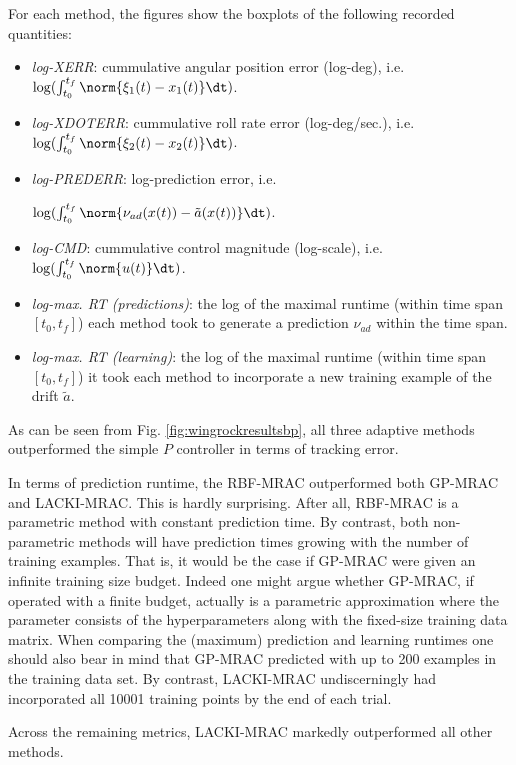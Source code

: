 	
	For each method, the figures show the boxplots of the following recorded quantities: 
	\begin{itemize}
		\item \textit{log-XERR}: cummulative angular position error (log-deg), i.e. $\log(\int_{t_0}^{t_f} \norm{\xi_1(t) - x_1 (t)} \dt )$.
		\item \textit{log-XDOTERR}:  cummulative roll rate error (log-deg/sec.), i.e. $\log(\int_{t_0}^{t_f} \norm{\xi_2(t) - x_2 (t)} \dt )$.
		\item \textit{log-PREDERR}: log-prediction error, i.e. 
		
		$\log(\int_{t_0}^{t_f} \norm{\nu_{ad}(x(t)) - \tilde a(x(t))} \dt )$.
		\item \textit{log-CMD}: cummulative control magnitude (log-scale), i.e. $\log(\int_{t_0}^{t_f} \norm{u(t)} \dt )$.
		\item \textit{log-max. RT (predictions)}: the log of the maximal runtime (within time span $[t_0,t_f]$) each method took to generate a prediction $\nu_{ad}$ within the time span.
		\item \textit{log-max. RT (learning)}: the log of the maximal runtime (within time span $[t_0,t_f]$) it took each method to incorporate a new training example of the drift $\tilde a$.
	\end{itemize}
	
	As can be seen from Fig. \ref{fig:wingrockresultsbp}, all three adaptive methods outperformed the simple $P$ controller in terms of tracking error. 
	
	In terms of prediction runtime, the RBF-MRAC outperformed both GP-MRAC and LACKI-MRAC. This is hardly surprising. After all, RBF-MRAC is a parametric method with constant prediction time. By contrast, both non-parametric methods will have prediction times growing with the number of training examples.
That is, it would be the case if GP-MRAC were given an infinite training size budget. Indeed one might argue whether GP-MRAC, if operated with a finite budget, actually is a parametric approximation where the parameter consists of the hyperparameters along with the fixed-size training data matrix. When comparing the (maximum) prediction and learning runtimes one should also bear in mind that GP-MRAC predicted with up to 200 examples in the training data set. By contrast, LACKI-MRAC undiscerningly had incorporated all 10001 training points by the end of each trial.

Across the remaining metrics, LACKI-MRAC markedly outperformed all other methods.


